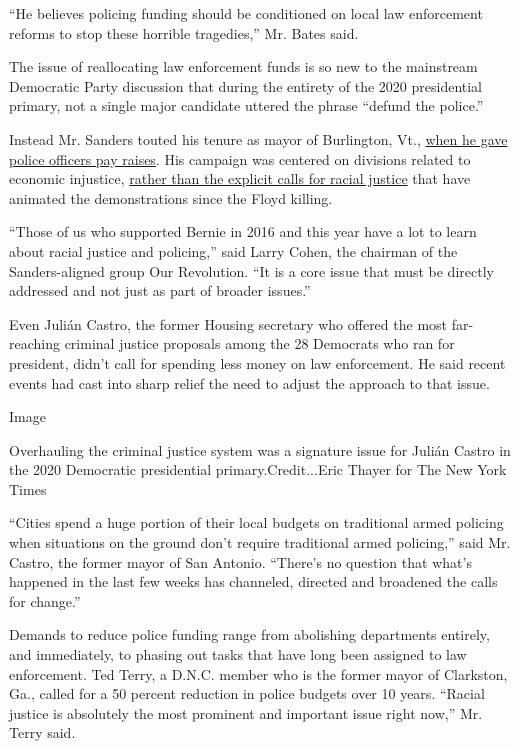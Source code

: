 ``He believes policing funding should be conditioned on local law
enforcement reforms to stop these horrible tragedies,'' Mr. Bates said.

The issue of reallocating law enforcement funds is so new to the
mainstream Democratic Party discussion that during the entirety of the
2020 presidential primary, not a single major candidate uttered the
phrase ``defund the police.''

Instead Mr. Sanders touted his tenure as mayor of Burlington, Vt.,
\href{https://www.nytimes3xbfgragh.onion/2015/11/26/us/politics/as-mayor-bernie-sanders-was-more-pragmatic-than-socialist.html}{when
he gave police officers pay raises}. His campaign was centered on
divisions related to economic injustice,
\href{https://www.nytimes3xbfgragh.onion/2020/06/19/us/politics/bernie-sanders-protests.html}{rather
than the explicit calls for racial justice} that have animated the
demonstrations since the Floyd killing.

``Those of us who supported Bernie in 2016 and this year have a lot to
learn about racial justice and policing,'' said Larry Cohen, the
chairman of the Sanders-aligned group Our Revolution. ``It is a core
issue that must be directly addressed and not just as part of broader
issues.''

Even Julián Castro, the former Housing secretary who offered the most
far-reaching criminal justice proposals among the 28 Democrats who ran
for president, didn't call for spending less money on law enforcement.
He said recent events had cast into sharp relief the need to adjust the
approach to that issue.

Image

Overhauling the criminal justice system was a signature issue for Julián
Castro in the 2020 Democratic presidential primary.Credit...Eric Thayer
for The New York Times

``Cities spend a huge portion of their local budgets on traditional
armed policing when situations on the ground don't require traditional
armed policing,'' said Mr. Castro, the former mayor of San Antonio.
``There's no question that what's happened in the last few weeks has
channeled, directed and broadened the calls for change.''

Demands to reduce police funding range from abolishing departments
entirely, and immediately, to phasing out tasks that have long been
assigned to law enforcement. Ted Terry, a D.N.C. member who is the
former mayor of Clarkston, Ga., called for a 50 percent reduction in
police budgets over 10 years. ``Racial justice is absolutely the most
prominent and important issue right now,'' Mr. Terry said.


